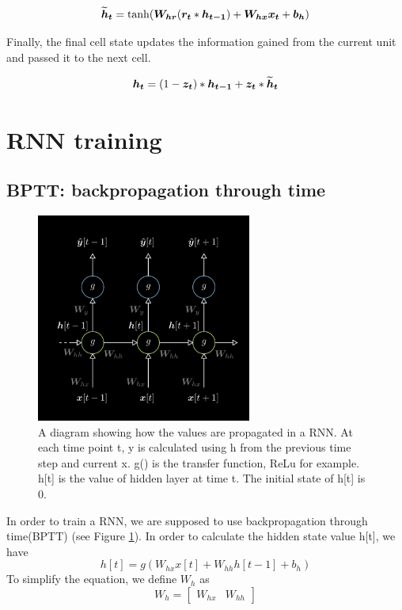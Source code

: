 \[\vect{\widetilde{h}_t} = \tanh(\matr{W_{hr}}(\vect{r_t}*\vect{h_{t-1}}) + \matr{W_{hx}}\vect{x_t} + \vect{b_h})\]

Finally, the final cell state updates the information gained from the current unit and passed it to the next cell.

\[\vect{h_t} = (1-\vect{z_t})*\vect{h_{t-1}} + \vect{z_t}*\vect{\widetilde{h}_t}\]



\section{RNN training}
\subsection{BPTT: backpropagation through time}
\begin{figure}[ht]
    \centering
    \includegraphics[width=200pt]{figs/bptt.png}
    \caption{A diagram showing how the values are propagated in a RNN. At each time point t, y is calculated using h from the previous time step and current x.  g() is the transfer function, ReLu for example. h[t] is the value of hidden layer at time t. The initial state of h[t] is 0.}
    \label{fig:bptt}
\end{figure}
In order to train a RNN, we are supposed to use backpropagation through time(BPTT) (see Figure \ref{fig:bptt}). In order to calculate the hidden state value h[t], we have\\
\begin{equation}
h[t] = g(W_{hx}x[t]+W_{hh}h[t-1]+b_h)
\end{equation}
To simplify the equation, we define $W_h$ as
\begin{equation}
    W_h = \begin{bmatrix}W_{hx} & W_{hh}\end{bmatrix}
\end{equation}

